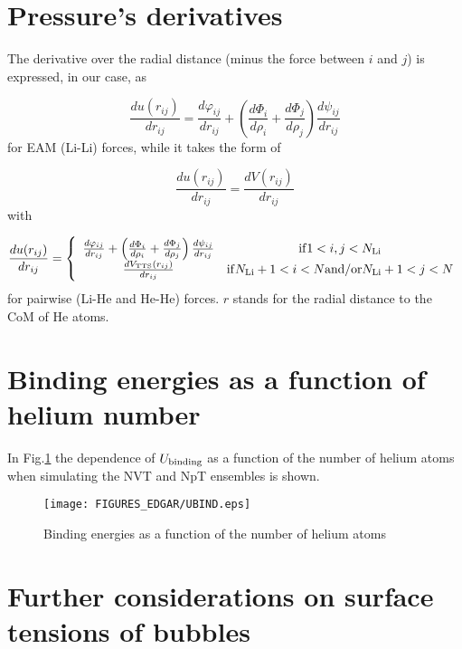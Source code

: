 \documentclass[jcp,amsmath,amssymb,preprint]{revtex4-1}
\begin{document}
\section{Pressure's derivatives}
    
The derivative over the radial distance (minus the force between $i$ and $j$) is expressed, in our case, as

\begin{equation}
             \frac{du(r_{ij})}{dr_{ij}} = \frac{d \varphi_{ij}}{d r_{ij}} + \left( \frac{d \Phi_i}{d \rho_i} + \frac{d \Phi_j}{d \rho_j}\right)\frac{d \psi_{ij}}{d r_{ij}}
\end{equation}
for EAM (Li-Li) forces, while it takes the form of

\begin{equation}
             \frac{du(r_{ij})}{dr_{ij}} = \frac{dV(r_{ij})}{dr_{ij}}
\end{equation}
with

\begin{eqnarray}
            \frac{du(r_{ij})}{dr_{ij}} = \left\{ 
            \begin{array}{cc}
            \frac{d \varphi_{ij}}{d r_{ij}} + \left( \frac{d \Phi_i}{d \rho_i} + \frac{d \Phi_j}{d \rho_j}\right)\frac{d \psi_{ij}}{d r_{ij}} & {\rm if } 1<i, j<N_{\rm Li}   \\
                 \frac{dV_{\rm TTS}(r_{ij})}{dr_{ij}} & {\rm if } N_{\rm Li}+1<i<N {\rm and/or } N_{\rm Li}+1<j<N 
            \end{array}
            \right.
\end{eqnarray}
for pairwise (Li-He and He-He) forces.  $r$ stands for the radial distance to the CoM of He atoms.

\section{Binding energies as a function of helium number}

In Fig.\ref{fig:Ub_NHe} the dependence of $U_{\rm binding}$ as a function of the number of helium atoms when simulating the NVT and NpT ensembles is shown.

\begin{figure}
        \centering
        \texttt{[image: FIGURES\_EDGAR/UBIND.eps]}
        \caption{Binding energies as a function of the number of helium atoms}
        \label{fig:Ub_NHe}
\end{figure}

\section{Further considerations on surface tensions of bubbles}
\end{document}
